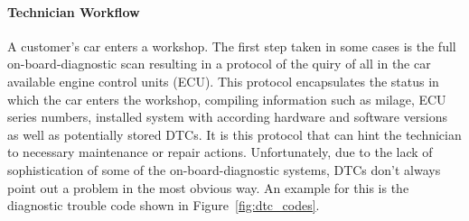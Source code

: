 \documentclass[conference,a4paper]{IEEEtran}
\begin{document}
\paragraph{Technician Workflow}
A customer's car enters a workshop. 
The first step taken in some cases is the full on-board-diagnostic scan resulting in a protocol of the quiry of all in the car available engine control units (ECU). 
This protocol encapsulates the status in which the car enters the workshop, compiling information such as milage, ECU series numbers, installed system with according hardware and software versions as well as potentially stored DTCs.
It is this protocol that can hint the technician to necessary maintenance or repair actions.
Unfortunately, due to the lack of sophistication of some of the on-board-diagnostic systems, DTCs don't always point out a problem in the most obvious way. 
An example for this is the diagnostic trouble code shown in Figure~\ref{fig:dtc_codes}.

\end{document}
